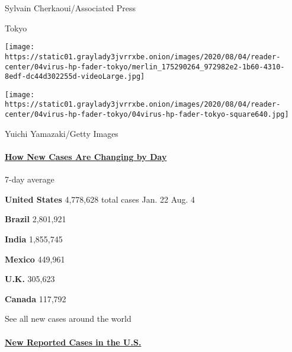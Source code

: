  Sylvain Cherkaoui/Associated Press

Tokyo

\texttt{[image: https://static01.graylady3jvrrxbe.onion/images/2020/08/04/reader-center/04virus-hp-fader-tokyo/merlin\_175290264\_972982e2-1b60-4310-8edf-dc44d302255d-videoLarge.jpg]}

\texttt{[image: https://static01.graylady3jvrrxbe.onion/images/2020/08/04/reader-center/04virus-hp-fader-tokyo/04virus-hp-fader-tokyo-square640.jpg]}

 Yuichi Yamazaki/Getty Images

\hypertarget{how-new-cases-are-changing-by-day}{%
\paragraph{\texorpdfstring{\href{https://www.nytimes3xbfgragh.onion/interactive/2020/world/coronavirus-maps.html}{How
New Cases Are Changing by
Day}}{How New Cases Are Changing by Day}}\label{how-new-cases-are-changing-by-day}}

\href{https://www.nytimes3xbfgragh.onion/interactive/2020/us/coronavirus-us-cases.html}{}

7-day average

\textbf{United States} 4,778,628 total cases Jan. 22 Aug.
4\href{https://www.nytimes3xbfgragh.onion/interactive/2020/world/americas/brazil-coronavirus-cases.html}{}

\textbf{Brazil} 2,801,921
\href{https://www.nytimes3xbfgragh.onion/interactive/2020/world/asia/india-coronavirus-cases.html}{}

\textbf{India} 1,855,745
\href{https://www.nytimes3xbfgragh.onion/interactive/2020/world/americas/mexico-coronavirus-cases.html}{}

\textbf{Mexico} 449,961
\href{https://www.nytimes3xbfgragh.onion/interactive/2020/world/europe/united-kingdom-coronavirus-cases.html}{}

\textbf{U.K.} 305,623
\href{https://www.nytimes3xbfgragh.onion/interactive/2020/world/canada/canada-coronavirus-cases.html}{}

\textbf{Canada} 117,792

\href{https://www.nytimes3xbfgragh.onion/interactive/2020/world/coronavirus-maps.html}{}

See all new cases around the world

\hypertarget{new-reported-cases-in-the-us}{%
\paragraph{\texorpdfstring{\href{https://www.nytimes3xbfgragh.onion/interactive/2020/us/coronavirus-us-cases.html}{New
Reported Cases in the
U.S.}}{New Reported Cases in the U.S.}}\label{new-reported-cases-in-the-us}}

